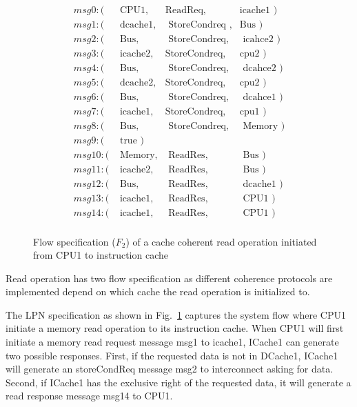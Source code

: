 \documentclass[conference]{IEEEtran}
\begin{document}
\begin{figure}
 {\footnotesize
 \[
 \begin{array}{llll}
 msg0: (&\mbox{ CPU1},&\mbox{ReadReq},&\mbox{icache1  })\\                   
 msg1: (&\mbox{ dcache1},&\mbox{ StoreCondreq },&\mbox{Bus })\\           
 msg2: (&\mbox{ Bus},&\mbox{ StoreCondreq},&\mbox{ icahce2 })\\
 msg3: (&\mbox{ icache2},&\mbox{StoreCondreq},&\mbox{cpu2       })\\      
 msg4: (&\mbox{ Bus},&\mbox{ StoreCondreq},&\mbox{ dcahce2           })\\ 
 msg5: (&\mbox{ dcache2},&\mbox{StoreCondreq},&\mbox{cpu2 })\\
 msg6: (&\mbox{ Bus},&\mbox{ StoreCondreq},&\mbox{ dcahce1     })\\       
 msg7: (&\mbox{ icache1},&\mbox{StoreCondreq},&\mbox{cpu1           })\\ 
 msg8: (&\mbox{ Bus},&\mbox{ StoreCondreq},&\mbox{ Memory })\\
 msg9: (&\mbox{ true                                        })\\
 msg10: (&\mbox{ Memory},&\mbox{ ReadRes},&\mbox{ Bus            })\\    
 msg11: (&\mbox{ icache2},&\mbox{ ReadRes},&\mbox{ Bus })\\
 msg12: (&\mbox{ Bus},&\mbox{ ReadRes},&\mbox{ dcache1      })\\            
 msg13: (&\mbox{ icache1},&\mbox{ ReadRes},&\mbox{ CPU1          })\\  
 msg14: (&\mbox{ icache1},&\mbox{ ReadRes},&\mbox{ CPU1 })\\
 \end{array}
 \]}
 \caption{Flow specification ($F_2$) of a cache coherent read operation initiated from CPU1 to instruction cache}
 \label{read-flow}
 
 \end{figure}
 
 Read operation has two flow specification as different coherence protocols are implemented depend on which cache the read operation is initialized to.
 
 The LPN specification as shown in Fig.~\ref{read-flow} captures the system flow where CPU1 initiate a memory read operation to its instruction cache. When CPU1 will first initiate a memory read request message msg1 to icache1, ICache1 can generate two possible responses. First, if the requested data is not in DCache1, ICache1 will generate an storeCondReq message msg2 to interconnect asking for data. Second, if ICache1 has the exclusive right of the requested data, it will generate a read response message msg14 to CPU1. 
\end{document}
